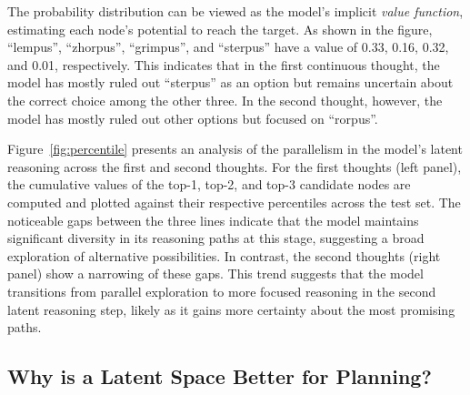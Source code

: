 \documentclass[]{fairmeta}
\begin{document}
The probability distribution can be viewed as the model's implicit \textit{value function}, estimating each node's potential to reach the target. As shown in the figure, ``lempus'', ``zhorpus'', ``grimpus'', and ``sterpus'' have a value of 0.33, 0.16, 0.32, and 0.01, respectively. This indicates that in the first continuous thought, the model has mostly ruled out ``sterpus'' as an option but remains uncertain about the correct choice among the other three. In the second thought, however, the model has mostly ruled out other options but focused on ``rorpus''.

Figure~\ref{fig:percentile} presents an analysis of the parallelism in the model's latent reasoning across the first and second thoughts. For the first thoughts (left panel), the cumulative values of the top-1, top-2, and top-3 candidate nodes are computed and plotted against their respective percentiles across the test set. The noticeable gaps between the three lines indicate that the model maintains significant diversity in its reasoning paths at this stage, suggesting a broad exploration of alternative possibilities. In contrast, the second thoughts (right panel) show a narrowing of these gaps. This trend suggests that the model transitions from parallel exploration to more focused reasoning in the second latent reasoning step, likely as it gains more certainty about the most promising paths. %





\subsection{Why is a Latent Space Better for Planning?}
\label{sec:height}
\end{document}
